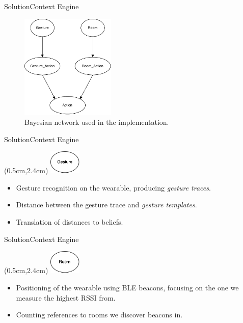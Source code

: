\begin{frame}{Solution}{Context Engine}
\begin{figure}[h]
\centering
\includegraphics[width=0.4\textwidth]{../images/bayesian-network-simple}
\caption{Bayesian network used in the implementation.}
\end{figure}
\end{frame}

\begin{frame}{Solution}{Context Engine}
\begin{textblock*}{1.5cm}(0.5cm,2.4cm)
\includegraphics[width=1.5cm]{../images/bayesian-network-gesture-node}
\end{textblock*}
\begin{itemize}
\item Gesture recognition on the wearable, producing \emph{gesture traces}.
\item Distance between the gesture trace and \emph{gesture templates}.
\item Translation of distances to beliefs.
\end{itemize}
\end{frame}

\begin{frame}{Solution}{Context Engine}
\begin{textblock*}{1.5cm}(0.5cm,2.4cm)
\includegraphics[width=1.5cm]{../images/bayesian-network-room-node}
\end{textblock*}
\begin{itemize}
\item Positioning of the wearable using BLE beacons, focusing on the one we measure the highest RSSI from.
\item Counting references to rooms we discover beacons in.
\end{itemize}
\end{frame}

